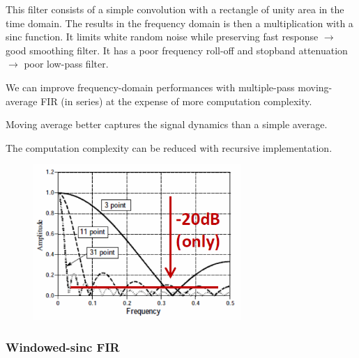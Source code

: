 \begin{minipage}{0.5 \linewidth}

This filter consists of a simple convolution with
a rectangle of unity area in the time domain. The results in the frequency domain is then a multiplication with a sinc function.
It limits white random noise
while preserving fast response $\rightarrow$ good smoothing filter. It has a poor frequency roll-off
and stopband attenuation $\rightarrow$ poor low-pass filter.

We can improve frequency-domain performances
with multiple-pass moving-average FIR (in series) at
the expense of more computation complexity.

Moving average better captures the signal dynamics than a simple average.

The computation complexity can be reduced with recursive implementation.
\end{minipage}\hfill
\begin{minipage}{0.5 \linewidth}

\begin{figure}[H]
    \centering
    \includegraphics[width = 0.7\textwidth]{L6/img/moving-area.PNG}
\end{figure}

\end{minipage}

\subsubsection{Windowed-sinc FIR}

